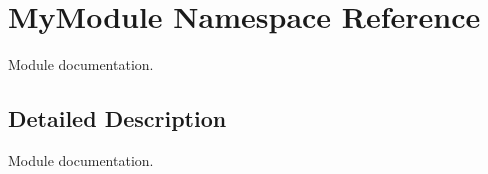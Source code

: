 \hypertarget{namespaceMyModule}{}\section{My\+Module Namespace Reference}
\label{namespaceMyModule}


Module documentation.  




\subsection{Detailed Description}
Module documentation. 
